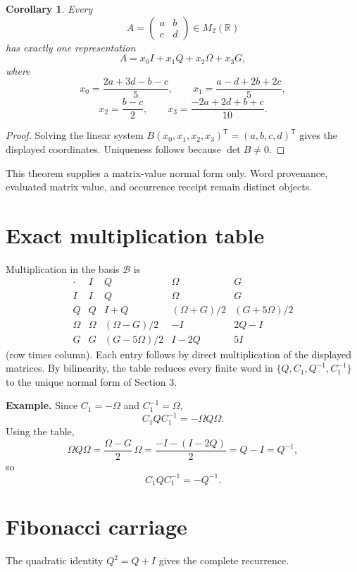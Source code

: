 \documentclass[11pt]{article}
\newtheorem{corollary}[theorem]{Corollary}
\theoremstyle{definition}
\newcommand{\R}{\mathbb R}
\newcommand{\Mtwo}{M_2(\R)}
\begin{document}
\begin{corollary}
Every
\[
A=\begin{pmatrix}a&b\\c&d\end{pmatrix}\in\Mtwo
\]
has exactly one representation
\[
A=x_0I+x_1Q+x_2\Omega+x_3G,
\]
where
\[
 x_0=\frac{2a+3d-b-c}{5},\qquad
 x_1=\frac{a-d+2b+2c}{5},
\]
\[
 x_2=\frac{b-c}{2},\qquad
 x_3=\frac{-2a+2d+b+c}{10}.
\]
\end{corollary}

\begin{proof}
Solving the linear system $B(x_0,x_1,x_2,x_3)^{\mathsf T}=(a,b,c,d)^{\mathsf T}$ gives the displayed coordinates. Uniqueness follows because $\det B\neq0$.
\end{proof}

This theorem supplies a matrix-value normal form only. Word provenance, evaluated matrix value, and occurrence receipt remain distinct objects.

\section{Exact multiplication table}

Multiplication in the basis $\mathcal B$ is
\[
\begin{array}{c|cccc}
\cdot & I & Q & \Omega & G\\ \hline
I      & I & Q & \Omega & G\\
Q      & Q & I+Q & (\Omega+G)/2 & (G+5\Omega)/2\\
\Omega & \Omega & (\Omega-G)/2 & -I & 2Q-I\\
G      & G & (G-5\Omega)/2 & I-2Q & 5I
\end{array}
\]
(row times column). Each entry follows by direct multiplication of the displayed matrices. By bilinearity, the table reduces every finite word in $\{Q,C_1,Q^{-1},C_1^{-1}\}$ to the unique normal form of Section 3.

\textbf{Example.} Since $C_1=-\Omega$ and $C_1^{-1}=\Omega$,
\[
C_1QC_1^{-1}=-\Omega Q\Omega.
\]
Using the table,
\[
\Omega Q\Omega
=\frac{\Omega-G}{2}\,\Omega
=\frac{-I-(I-2Q)}{2}
=Q-I=Q^{-1},
\]
so
\[
\boxed{C_1QC_1^{-1}=-Q^{-1}.}
\]

\section{Fibonacci carriage}

The quadratic identity $Q^2=Q+I$ gives the complete recurrence.
\end{document}
